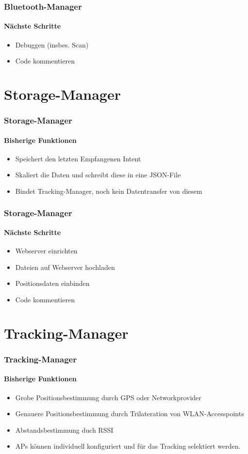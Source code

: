 \documentclass{beamer}
\begin{document}
\begin{frame}
\frametitle{Bluetooth-Manager}
\framesubtitle{N\"achste Schritte}
\begin{itemize}
  \item Debuggen (insbes. Scan)
  \item Code kommentieren
\end{itemize}
\end{frame}


\section{Storage-Manager}

\begin{frame}
\frametitle{Storage-Manager}
\framesubtitle{Bisherige Funktionen}
\begin{itemize}
  \item Speichert den letzten Empfangenen Intent
  \item Skaliert die Daten und schreibt diese in eine JSON-File
  \item Bindet Tracking-Manager, noch kein Datentransfer von diesem
\end{itemize}
\end{frame}

\begin{frame}
\frametitle{Storage-Manager}
\framesubtitle{N\"achste Schritte}
\begin{itemize}
  \item Webserver einrichten
  \item Dateien auf Webserver hochladen
  \item Positionsdaten einbinden
  \item Code kommentieren
\end{itemize}
\end{frame}

\section{Tracking-Manager}

\begin{frame}
\frametitle{Tracking-Manager}
\framesubtitle{Bisherige Funktionen}
\begin{itemize}
  \item Grobe Positionsbestimmung durch GPS oder Networkprovider
  \item	Genauere Positionsbestimmung durch Trilateration von WLAN-Accesspoints
  \item	Abstandsbestimmung duch RSSI
  \item	APs k\"onnen individuell konfiguriert und f\"ur das Tracking selektiert werden.
\end{itemize}
\end{frame}
\end{document}
